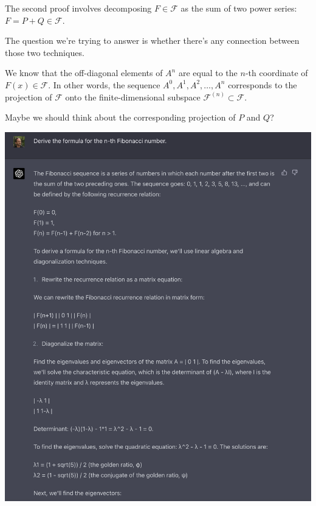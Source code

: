 The second proof involves decomposing $F \in \mathcal F$ as the sum of two power
series: $F = P + Q \in \mathcal F$.

The question we're trying to answer is whether there's any connection between those two techniques.

We know that the off-diagonal elements of $A^n$ are equal to the $n$-th coordinate
of $F(x) \in \mathcal F$. In other words, the sequence $A^0, A^1, A^2, \ldots, A^n$ corresponds to the
projection of $\mathcal F$ onto the finite-dimensional
subspace $\mathcal F^{(n)} \subset \mathcal F$.

Maybe we should think about the corresponding projection of $P$ and $Q$?


\begin{mdframed}
\includegraphics[width=400pt]{img/linear-algebra--vector-spaces-and-fields--computing-the-n-th-fibonacci-number-generating-function-26b7.png}
\end{mdframed}


